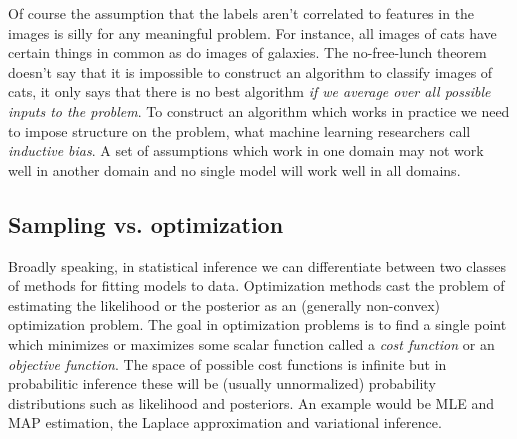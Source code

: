 \documentclass[12pt,dvipsnames]{report}
\renewcommand{\vec}[1]{\boldsymbol{\mathbf{#1}}}
\begin{document}
Of course the assumption that the labels aren't correlated to features in the
images is silly for any meaningful problem. For instance, all images of cats
have certain things in common as do images of galaxies. The no-free-lunch
theorem doesn't say that it is impossible to construct an algorithm to classify
images of cats, it only says that there is no best algorithm \emph{if we
    average over all possible inputs to the problem}. To construct an algorithm
which works in practice we need to impose structure on the problem, what
machine learning researchers call \emph{inductive bias}. A set of assumptions
which work in one domain may not work well in another domain and no single
model will work well in all domains.

\subsection{Sampling vs. optimization}
\label{ssec:sampling_vs_optimization}

Broadly speaking, in statistical inference we can differentiate between two
classes of methods for fitting models to data. Optimization methods cast the
problem of estimating the likelihood or the posterior as an (generally
non-convex) optimization problem. The goal in optimization problems is to find
a single point which minimizes or maximizes some scalar function called a
\textsl{cost function} or an \textsl{objective function}. The space of possible
cost functions is infinite but in probabilitic inference these will be (usually
unnormalized) probability distributions such as likelihood and posteriors. An
example would be MLE and MAP estimation, the Laplace approximation and
variational inference.
\end{document}
